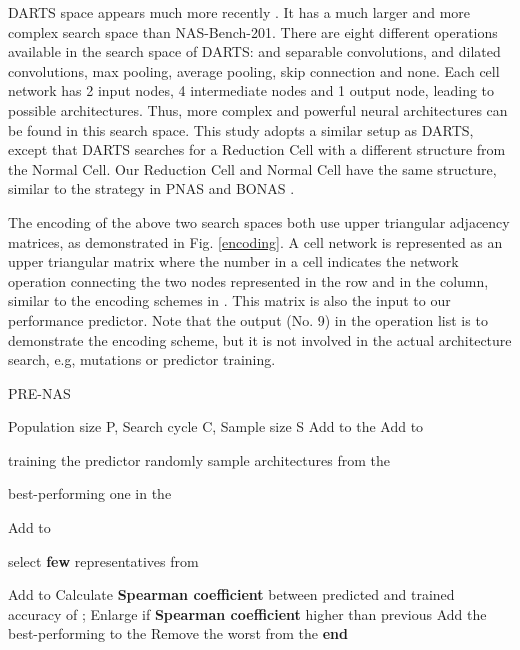 \documentclass[sigconf]{acmart}
\begin{document}
DARTS space appears much more recently  \cite{Ref:52,Ref:33,Ref:31,Ref:53,Ref:07}. It has a much larger and more complex search space than NAS-Bench-201. There are eight different operations available in the search space of DARTS:  and  separable convolutions,  and  dilated convolutions,  max pooling,  average pooling, skip connection and none.  Each cell network has 2 input nodes, 4 intermediate nodes and 1 output node, leading to  possible architectures. Thus, more complex and powerful neural architectures can be found in this search space.  This study adopts a similar setup as DARTS, except that DARTS searches for a Reduction Cell with a different structure from the Normal Cell.  Our Reduction Cell and Normal Cell have the same structure, similar to the strategy in PNAS \cite{Ref:40} and BONAS \cite{Ref:31}.


The encoding of the above two search spaces both use upper triangular adjacency matrices, as demonstrated in Fig. \ref{encoding}.  A cell network is represented as an upper triangular matrix where the number in a cell indicates the network operation connecting the two nodes represented in the row and in the column, similar to the encoding schemes in \cite{Ref:45,Ref:31}.  This matrix is also the input to our performance predictor.  Note that the output (No. 9) in the operation list is to demonstrate the encoding scheme,  but it is not involved in the actual architecture search, e.g, mutations or predictor training.

\begin{algorithm}[!t]
\caption{PRE-NAS}
\label{algo}
\begin{algorithmic}[1]
\REQUIRE Population size P, Search cycle C, Sample size S
\STATE 
\STATE 
\STATE 
\WHILE {  }
\STATE  
\STATE  
\STATE Add  to the 
\STATE Add  to 
\ENDWHILE

\STATE  training the predictor
\STATE  randomly sample  architectures from the 

\STATE  best-performing one in the   

\STATE  
\STATE  
\STATE Add  to 
\ENDWHILE

\STATE  select \textbf{few} representatives from 

\FORALL{}
\STATE 
\STATE Add  to 
\ENDFOR
\STATE Calculate \textbf{Spearman coefficient} between predicted and trained accuracy of  ;
\STATE Enlarge  if \textbf{Spearman coefficient} higher than previous
\STATE Add the best-performing  to the 
\STATE Remove the worst  from the 
\ENDWHILE
\STATE \textbf{end}
\end{algorithmic}
\end{algorithm}
\end{document}
